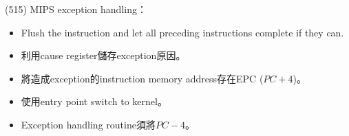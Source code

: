 \item \begin{theorem}{(515)} MIPS exception handling： \begin{itemize}
        \item Flush the instruction and let all preceding instructions complete if they can.
        \item 利用cause register儲存exception原因。
        \item 將造成exception的instruction memory address存在EPC ($PC + 4$)。
        \item 使用entry point switch to kernel。
        \item Exception handling routine須將$PC - 4$。
    \end{itemize}
\end{theorem}
